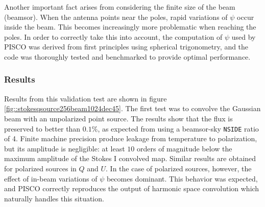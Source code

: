 \documentclass[a4paper,11pt]{article}
\begin{document}
Another important fact arises from considering the finite size of the beam (beamsor). When the antenna points near the poles, rapid variations of $\psi$ occur inside the beam. This becomes increasingly more problematic when reaching the poles. In order to correctly take this into account, the computation of $\psi$ used by PISCO was derived from first principles using spherical trigonometry, and the code was thoroughly tested and benchmarked to provide optimal performance. 

\subsubsection{Results}

Results from this validation test are shown in figure \ref{fig::stokesqsource256beam1024dec45}. The first test was to convolve the Gaussian beam with an unpolarized point source. The results show that the flux is preserved to better than $0.1\%$, as expected from using a beamsor-sky \texttt{NSIDE} ratio of 4. Finite machine precision produce leakage from temperature to polarization, but its amplitude is negligible: at least $10$ orders of magnitude below the maximum amplitude of the Stokes I convolved map. Similar results are obtained for polarized sources in $Q$ and $U$. In the case of polarized sources, however, the effect of in-beam variations of $\psi$ becomes dominant. This behavior was expected, and PISCO correctly reproduces the output of harmonic space convolution which naturally handles this situation.
\end{document}
